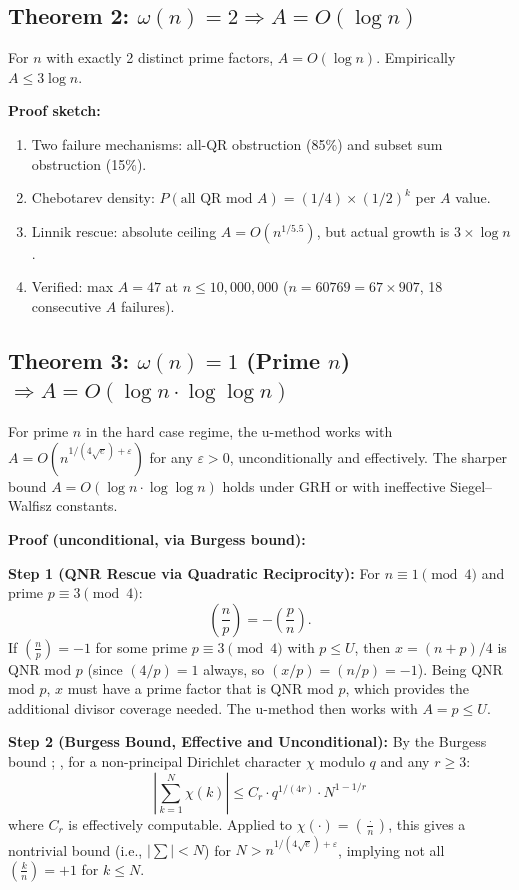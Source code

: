 \documentclass[11pt]{article}
\theoremstyle{remark}
\newcommand{\leg}[2]{\left(\frac{#1}{#2}\right)}
\begin{document}
\subsection{Theorem 2: $\omega(n) = 2 \Rightarrow A = O(\log n)$}

For $n$ with exactly 2 distinct prime factors, $A = O(\log n)$. Empirically $A \leq 3\log n$.

\textbf{Proof sketch:}
\begin{enumerate}
\item Two failure mechanisms: all-QR obstruction (85\%) and subset sum obstruction (15\%).
\item Chebotarev density: $P(\text{all QR mod } A) = (1/4) \times (1/2)^k$ per $A$ value.
\item Linnik rescue: absolute ceiling $A = O(n^{1/5.5})$, but actual growth is $3 \times \log n$.
\item Verified: max $A = 47$ at $n \leq 10{,}000{,}000$ ($n = 60769 = 67 \times 907$, 18 consecutive $A$ failures).
\end{enumerate}

\subsection{Theorem 3: $\omega(n) = 1$ (Prime $n$) $\Rightarrow A = O(\log n \cdot \log\log n)$}

For prime $n$ in the hard case regime, the u-method works with $A = O(n^{1/(4\sqrt{e})+\varepsilon})$ for any $\varepsilon > 0$, unconditionally and effectively. The sharper bound $A = O(\log n \cdot \log\log n)$ holds under GRH or with ineffective Siegel--Walfisz constants.

\textbf{Proof (unconditional, via Burgess bound):}

\textbf{Step 1 (QNR Rescue via Quadratic Reciprocity):}
For $n \equiv 1 \pmod{4}$ and prime $p \equiv 3 \pmod{4}$:
\[
\leg{n}{p} = -\leg{p}{n}.
\]
If $\leg{n}{p} = -1$ for some prime $p \equiv 3 \pmod{4}$ with $p \leq U$, then $x = (n+p)/4$ is QNR mod $p$ (since $(4/p) = 1$ always, so $(x/p) = (n/p) = -1$). Being QNR mod $p$, $x$ must have a prime factor that is QNR mod $p$, which provides the additional divisor coverage needed. The u-method then works with $A = p \leq U$.

\textbf{Step 2 (Burgess Bound, Effective and Unconditional):}
By the Burgess bound \cite{burgess1963}; \cite[\S12.6]{IK2004}, for a non-principal Dirichlet character $\chi$ modulo $q$ and any $r \geq 3$:
\[
\left|\sum_{k=1}^{N} \chi(k)\right| \leq C_r \cdot q^{1/(4r)} \cdot N^{1-1/r}
\]
where $C_r$ is effectively computable. Applied to $\chi(\cdot) = \leg{\cdot}{n}$, this gives a nontrivial bound (i.e., $|\sum| < N$) for $N > n^{1/(4\sqrt{e})+\varepsilon}$, implying not all $\leg{k}{n} = +1$ for $k \leq N$.
\end{document}
